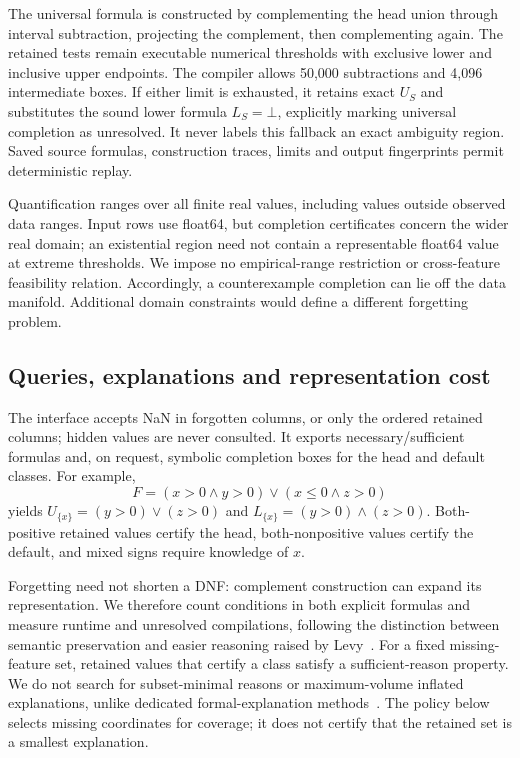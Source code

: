 The universal formula is constructed by complementing the head union through interval subtraction, projecting the complement, then complementing again. The retained tests remain executable numerical thresholds with exclusive lower and inclusive upper endpoints. The compiler allows 50,000 subtractions and 4,096 intermediate boxes. If either limit is exhausted, it retains exact $U_S$ and substitutes the sound lower formula $L_S=\bot$, explicitly marking universal completion as unresolved. It never labels this fallback an exact ambiguity region. Saved source formulas, construction traces, limits and output fingerprints permit deterministic replay.

Quantification ranges over all finite real values, including values outside observed data ranges. Input rows use float64, but completion certificates concern the wider real domain; an existential region need not contain a representable float64 value at extreme thresholds. We impose no empirical-range restriction or cross-feature feasibility relation. Accordingly, a counterexample completion can lie off the data manifold. Additional domain constraints would define a different forgetting problem.

\subsection{Queries, explanations and representation cost}
The interface accepts NaN in forgotten columns, or only the ordered retained columns; hidden values are never consulted. It exports necessary/sufficient formulas and, on request, symbolic completion boxes for the head and default classes. For example,
\begin{equation}
 F=(x>0\land y>0)\lor(x\leq0\land z>0)
\end{equation}
yields $U_{\{x\}}=(y>0)\lor(z>0)$ and $L_{\{x\}}=(y>0)\land(z>0)$. Both-positive retained values certify the head, both-nonpositive values certify the default, and mixed signs require knowledge of $x$.

Forgetting need not shorten a DNF: complement construction can expand its representation. We therefore count conditions in both explicit formulas and measure runtime and unresolved compilations, following the distinction between semantic preservation and easier reasoning raised by Levy~\citep{levy1994forget}. For a fixed missing-feature set, retained values that certify a class satisfy a sufficient-reason property. We do not search for subset-minimal reasons or maximum-volume inflated explanations, unlike dedicated formal-explanation methods~\citep{darwiche2020reasons,izza2025general}. The policy below selects missing coordinates for coverage; it does not certify that the retained set is a smallest explanation.
